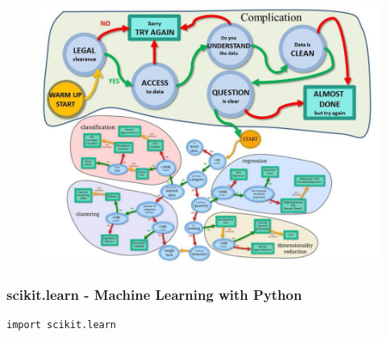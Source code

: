 \documentclass{beamer}
\begin{document}
\begin{frame}
	\begin{figure}
		\centering
		\includegraphics[width=0.9\linewidth]{SKLCheatSheet2}
		
	\end{figure}
\end{frame}






\begin{frame}[fragile]
\frametitle{scikit.learn - Machine Learning with Python}
\LARGE	
\begin{framed}
\begin{verbatim}
import scikit.learn
\end{verbatim}
\end{framed}
\end{frame}
\end{document}

